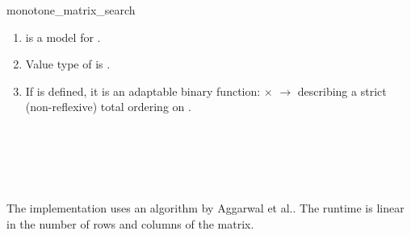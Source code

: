 \begin{ccRefFunction}{monotone_matrix_search}
\begin{ccAdvanced}
    \cgalColumnLayout

    \ccRequire
    \begin{enumerate}
    \item {} is a model for
      .
    \item Value type of  is .
    \item If  is defined, it is an adaptable
      binary function:  $\times$
       $\rightarrow$  describing a strict
      (non-reflexive) total ordering on .
    \end{enumerate}
    
    \ccSeeAlso
    \\
    \\
    \\
    \\

    \ccImplementation The implementation uses an algorithm by Aggarwal
    et al.\cite{akmsw-gamsa-87}. The runtime is linear in the number
    of rows and columns of the matrix.

  \end{ccAdvanced}  
\end{ccRefFunction}

